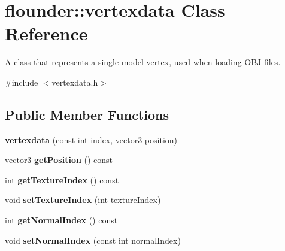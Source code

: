 \hypertarget{classflounder_1_1vertexdata}{}\section{flounder\+:\+:vertexdata Class Reference}
\label{classflounder_1_1vertexdata}


A class that represents a single model vertex, used when loading O\+BJ files.  




{\ttfamily \#include $<$vertexdata.\+h$>$}

\subsection*{Public Member Functions}
\begin{DoxyCompactItemize}
\item 
\mbox{\label{classflounder_1_1vertexdata_a8103c1f427f47cf525e7e36797482a28}} 
{\bfseries vertexdata} (const int index, \hyperlink{classflounder_1_1vector3}{vector3} position)
\item 
\mbox{\label{classflounder_1_1vertexdata_ad20bf693c28279b6304bc8f01f21ef16}} 
\hyperlink{classflounder_1_1vector3}{vector3} {\bfseries get\+Position} () const
\item 
\mbox{\label{classflounder_1_1vertexdata_a71f07e29545a414d90c1776806188adf}} 
int {\bfseries get\+Texture\+Index} () const
\item 
\mbox{\label{classflounder_1_1vertexdata_ae3465e492ba9d4afe163d64daff89932}} 
void {\bfseries set\+Texture\+Index} (int texture\+Index)
\item 
\mbox{\label{classflounder_1_1vertexdata_a0ab94a0078cdc583911c2c95133ad0e0}} 
int {\bfseries get\+Normal\+Index} () const
\item 
\mbox{\label{classflounder_1_1vertexdata_a65c0ec8ab102a2e3c70c4d1d8841d55c}} 
void {\bfseries set\+Normal\+Index} (const int normal\+Index)
\item 
\mbox{\label{classflounder_1_1vertexdata_a692a754e8f7f9fe782a9dacb9ed82de1}} 

\end{DoxyCompactItemize}
